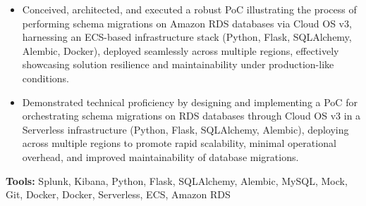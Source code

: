 \documentclass[11pt,a4paper,english]{moderncv}
\begin{document}
{\begin{itemize}
\begin{itemize}
            \item Conceived, architected, and executed a robust PoC illustrating the process of performing schema migrations on Amazon RDS databases via Cloud OS v3, harnessing an ECS-based infrastructure stack (Python, Flask, SQLAlchemy, Alembic, Docker), deployed seamlessly across multiple regions, effectively showcasing solution resilience and maintainability under production-like conditions.
            \item Demonstrated technical proficiency by designing and implementing a PoC for orchestrating schema migrations on RDS databases through Cloud OS v3 in a Serverless infrastructure (Python, Flask, SQLAlchemy, Alembic), deploying across multiple regions to promote rapid scalability, minimal operational overhead, and improved maintainability of database migrations.
        \end{itemize}
        \textbf{Tools:} Splunk, Kibana, Python, Flask, SQLAlchemy, Alembic, MySQL, Mock, Git, Docker, Docker, Serverless, ECS, Amazon RDS
\end{itemize}
}
\end{document}
